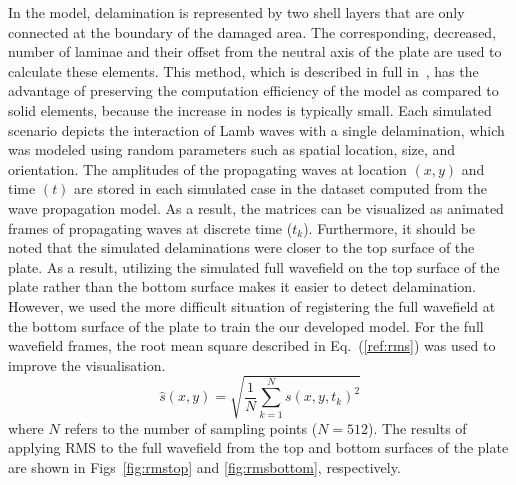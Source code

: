 \documentclass[runningheads]{llncs}
\begin{document}
In the model, delamination is represented by two shell layers that are only connected at the boundary of the damaged area.
The corresponding, decreased, number of laminae and their offset from the neutral axis of the plate are used to calculate these elements.
This method, which is described in full in~\cite{Kudela2009}, has the advantage of preserving the computation efficiency of the model as compared to solid elements, because the increase in nodes is typically small.
Each simulated scenario depicts the interaction of Lamb waves with a single delamination, which was modeled using random parameters such as spatial location, size, and orientation.
The amplitudes of the propagating waves at location \((x,y)\) and time \((t)\) are stored in each simulated case in the dataset computed from the wave propagation model.
As a result, the matrices can be visualized as animated frames of propagating waves at discrete time (\(t_k\)).
Furthermore, it should be noted that the simulated delaminations were closer to the top surface of the plate.
As a result, utilizing the simulated full wavefield on the top surface of the plate rather than the bottom surface makes it easier to detect delamination.
However, we used the more difficult situation of registering the full wavefield at the bottom surface of the plate to train the our developed model.
For the full wavefield frames, the root mean square described in Eq.~(\ref{ref:rms}) was used to improve the visualisation.
\begin{equation}
	\hat{s}(x,y) = \sqrt{\frac{1}{N}\sum_{k=1}^{N} s(x,y,t_k)^2}
	\label{ref:rms}
\end{equation}
where \(N\) refers to the number of sampling points (\(N=512\)).
The results of applying RMS to the full wavefield from the top and bottom surfaces of the plate are shown in Figs~\ref{fig:rmstop} and \ref{fig:rmsbottom}, respectively.
\end{document}
